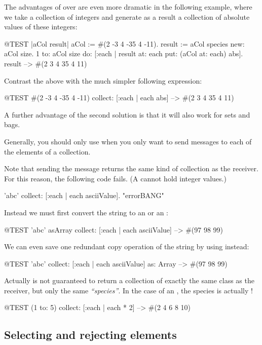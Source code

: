 \documentclass[a4paper,10pt,twoside]{book}
\begin{document}
The advantages of  over  are even more dramatic in the following example, where we take a collection of integers and generate as a result a collection of absolute values of these integers:

\begin{code}{@TEST |aCol result|}
aCol :=  #(2 -3 4 -35 4 -11).
result := aCol species new: aCol size.
1 to: aCol size do: [:each | result at: each put: (aCol at: each) abs].
result --> #(2 3 4 35 4 11)
\end{code}
\noindent
Contrast the above with the much simpler following expression:
\begin{code}{@TEST}
#(2 -3 4 -35 4 -11) collect: [:each | each abs] --> #(2 3 4 35 4 11)
\end{code}
\noindent
A further advantage of the second solution is that it will also work for sets and bags.

Generally, you should only use  when you only want to send messages to each of the elements of a collection.

Note that sending the message  returns the same kind of collection as the receiver.
For this reason, the following code fails.
(A  cannot hold integer values.)
\begin{code}{}
'abc' collect: [:each | each asciiValue].      "errorBANG"
\end{code}
\noindent
Instead we must first convert the string to an  or an :
\begin{code}{@TEST}
'abc' asArray collect: [:each | each asciiValue] --> #(97 98 99)
\end{code}
We can even save one redundant copy operation of the string by using  instead:
\begin{code}{@TEST}
'abc' collect: [:each | each asciiValue] as: Array --> #(97 98 99)
\end{code}

Actually  is not guaranteed to return a collection of exactly the same class as the receiver, but only the same \emph{``species''}.
In the case of an , the species is actually !
\begin{code}{@TEST}
(1 to: 5) collect: [:each | each * 2] --> #(2 4 6 8 10)
\end{code}

\subsection{Selecting and rejecting elements}
\end{document}
